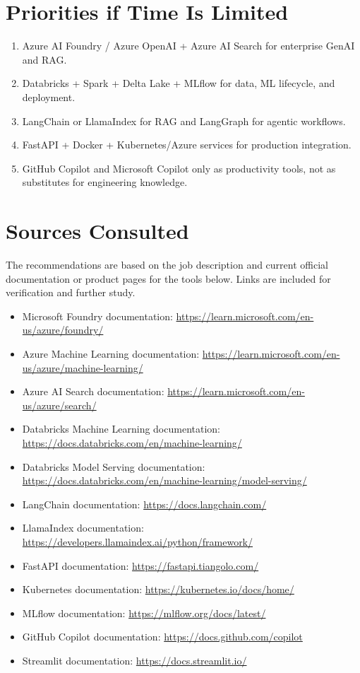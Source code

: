 \documentclass[a4paper]{article}
\begin{document}
\section*{Priorities if Time Is Limited}
\begin{enumerate}
    \item Azure AI Foundry / Azure OpenAI + Azure AI Search for enterprise GenAI and RAG.
    \item Databricks + Spark + Delta Lake + MLflow for data, ML lifecycle, and deployment.
    \item LangChain or LlamaIndex for RAG and LangGraph for agentic workflows.
    \item FastAPI + Docker + Kubernetes/Azure services for production integration.
    \item GitHub Copilot and Microsoft Copilot only as productivity tools, not as substitutes for engineering knowledge.
\end{enumerate}

\section*{Sources Consulted}
The recommendations are based on the job description and current official documentation or product pages for the tools below. Links are included for verification and further study.

\begin{itemize}
    \item Microsoft Foundry documentation: \url{https://learn.microsoft.com/en-us/azure/foundry/}
    \item Azure Machine Learning documentation: \url{https://learn.microsoft.com/en-us/azure/machine-learning/}
    \item Azure AI Search documentation: \url{https://learn.microsoft.com/en-us/azure/search/}
    \item Databricks Machine Learning documentation: \url{https://docs.databricks.com/en/machine-learning/}
    \item Databricks Model Serving documentation: \url{https://docs.databricks.com/en/machine-learning/model-serving/}
    \item LangChain documentation: \url{https://docs.langchain.com/}
    \item LlamaIndex documentation: \url{https://developers.llamaindex.ai/python/framework/}
    \item FastAPI documentation: \url{https://fastapi.tiangolo.com/}
    \item Kubernetes documentation: \url{https://kubernetes.io/docs/home/}
    \item MLflow documentation: \url{https://mlflow.org/docs/latest/}
    \item GitHub Copilot documentation: \url{https://docs.github.com/copilot}
    \item Streamlit documentation: \url{https://docs.streamlit.io/}
\end{itemize}



\end{document}
